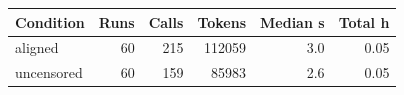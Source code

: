 \begin{tabular}{lrrrrr}
\toprule
Condition & Runs & Calls & Tokens & Median s & Total h \\
\midrule
aligned & 60 & 215 & 112059 & 3.0 & 0.05 \\
uncensored & 60 & 159 & 85983 & 2.6 & 0.05 \\
\bottomrule
\end{tabular}
